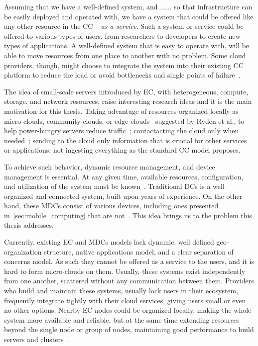 Assuming that we have a well-defined system, and ...... so that infrastructure can be easily deployed and operated with, we have a system that could be offered like any other resource in the CC -- \emph{as a service}. Such a system or service could be offered to various types of users, from researchers to developers to create new types of applications. A well-defined system that is easy to operate with, will be able to move resources from one place to another with no problem. Some cloud providers, though, might choose to integrate the system into their existing CC platform to reduce the load or avoid bottlenecks and single points of failure~\cite{JararwehDAAAB16}.

The idea of small-scale servers introduced by EC, with heterogeneous, compute, storage, and network resources, raise interesting research ideas and it is the main motivation for this thesis. Taking advantage of resources organized locally as micro clouds, community clouds, or edge clouds~\cite{RydenOCW14} suggested by Ryden et al., to help power-hungry servers reduce traffic~\cite{HirschMZ18}; contactacting the cloud only when needed~\cite{inproceedingsSimic1}; sending to the cloud only information that is crucial for other services or applications; not ingesting everything as the standard CC model proposes.

To achieve such behavior, dynamic resource management, and device management is essential. At any given time, available resources, configuration, and utilization of the system must be known~\cite{GubbiBMP13, WangZZWYW17}. Traditional DCs is a well organized and connected system, built upon years of experience. On the other hand, these MDCs consist of various devices, including ones presented in~\ref{sec:mobile_computing} that are not~\cite{JiangCGZW19}. This idea brings us to the problem this thesis addresses.

Currently, existing EC and MDCs models lack dynamic, well defined geo-organization structure, native applications model, and a clear separation of concerns model. As such they cannot be offered as a service to the users, and it is hard to form micro-clouds on them. Usually, these systems exist independently from one another, scattered without any communication between them. Providers who build and maintain these systems, usually lock users in their ecosystem, frequently integrate tightly with their cloud services, giving users small or even no other options. Nearby EC nodes could be organized locally, making the whole system more available and reliable, but at the same time extending resources beyond the single node or group of nodes, maintaining good performance to build servers and clusters~\cite{ArocaG12}.

